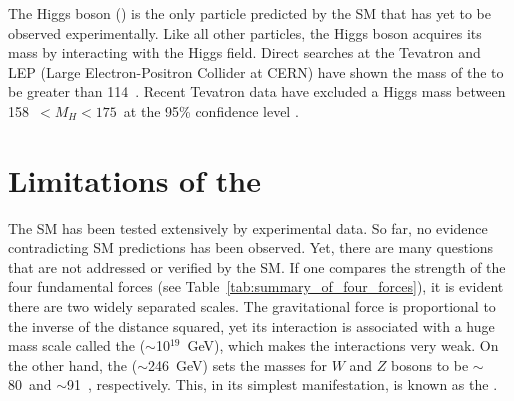 The Higgs boson () is the only particle predicted by the SM that has yet to be observed experimentally. Like all other particles, the Higgs boson acquires its mass by interacting with the Higgs field. Direct searches at the Tevatron and LEP (Large Electron-Positron Collider at CERN) have shown the mass of the  to be greater than 114~\massunits. Recent Tevatron data have excluded a Higgs mass between 158~$<M_{H}<175$~\massunits at the 95\% confidence level \cite{pap:HiggsLimits}.

\section{Limitations of the \SMtext}
The SM has been tested extensively by experimental data. So far, no evidence contradicting SM predictions has been observed. Yet, there are many questions that are not addressed or verified by the SM. If one compares the strength of the four fundamental forces (see Table~\ref{tab:summary_of_four_forces}), it is evident there are two widely separated scales. The gravitational force is proportional to the inverse of the distance squared, yet its interaction is associated with a huge mass scale called the  ($\sim$10$^{19}$~GeV), which makes the interactions very weak. On the other hand, the  (\mbox{$\sim$246 GeV}) sets the masses for $W$ and $Z$ bosons to be $\sim$80~\massunits and $\sim$91~\massunits, respectively. This, in its simplest manifestation, is known as the .

